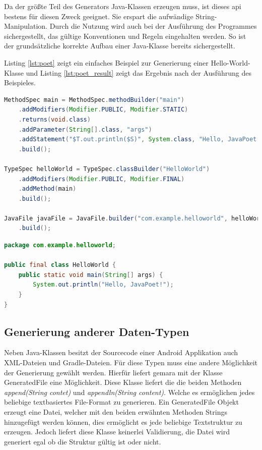 Da der größte Teil des Generators Java-Klassen erzeugen muss, ist dieses \ac{api} bestens für diesen Zweck geeignet. Sie erspart die aufwändige String-Manipulation. Durch die Nutzung wird auch bei der Ausführung des Programmes sichergestellt, das gültige Konventionen und Regeln eingehalten werden. So ist der grundsätzliche korrekte Aufbau einer Java-Klasse bereits sichergestellt.

Listing \ref{lst:poet} zeigt ein einfaches Beispiel zur Generierung einer Hello-World-Klasse und Listing \ref{lst:poet_result} zeigt das Ergebnis nach der Ausführung des Beispieles.

\begin{lstlisting}[label=lst:poet,
language=java,
firstnumber=1,
caption=Beispiel für die Generation einer Hallo-World-Klasse \cite{poet}.]				   
MethodSpec main = MethodSpec.methodBuilder("main")
	.addModifiers(Modifier.PUBLIC, Modifier.STATIC)
	.returns(void.class)
	.addParameter(String[].class, "args")
	.addStatement("$T.out.println($S)", System.class, "Hello, JavaPoet!")
	.build();

TypeSpec helloWorld = TypeSpec.classBuilder("HelloWorld")
	.addModifiers(Modifier.PUBLIC, Modifier.FINAL)
	.addMethod(main)
	.build();

JavaFile javaFile = JavaFile.builder("com.example.helloworld", helloWorld)
	.build();
\end{lstlisting}

\begin{lstlisting}[label=lst:poet_result,
language=java,
firstnumber=1,
caption=Ergebnis der Generation von Listing \ref{lst:poet} \cite{poet}.]				   
package com.example.helloworld;

public final class HelloWorld {
	public static void main(String[] args) {
		System.out.println("Hello, JavaPoet!");
	}
}
\end{lstlisting}

\subsection{Generierung anderer Daten-Typen}

Neben Java-Klassen besitzt der Sourcecode einer Android Applikation auch XML-Dateien und Gradle-Dateien. Für diese Typen muss eine andere Möglichkeit der Generierung gewählt werden. Hierfür liefert \acf{gemara} mit der Klasse GeneratedFile eine Möglichkeit. Diese Klasse liefert die die beiden Methoden \textit{append(String contet)} und \textit{appendln(String content)}. Welche es ermöglichen jedes beliebige textbasiertes File-Format zu generieren. Ein GeneratedFile Objekt erzeugt eine Datei, welcher mit den beiden erwähnten Methoden Strings hinzugefügt werden können, dies ermöglicht es jede beliebige Textstruktur zu erzeugen. Jedoch liefert diese Klasse keinerlei Validierung, die Datei wird generiert egal ob die Struktur gültig ist oder nicht.

